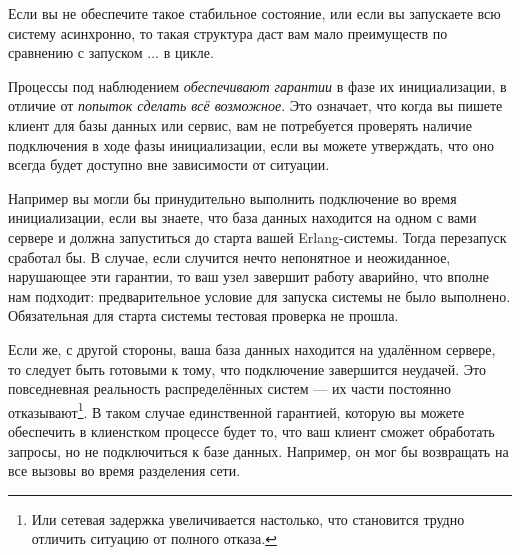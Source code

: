 Если вы не обеспечите такое стабильное состояние, или если вы запускаете всю систему асинхронно, то такая структура даст вам мало преимуществ по сравнению с запуском  ...  в цикле.

Процессы под наблюдением \emph{обеспечивают гарантии} в фазе их инициализации, в отличие от \emph{попыток сделать всё возможное}. Это означает, что когда вы пишете клиент для базы данных или сервис, вам не потребуется проверять наличие подключения в ходе фазы инициализации, если вы можете утверждать, что оно всегда будет доступно вне зависимости от ситуации.

Например вы могли бы принудительно выполнить подключение во время инициализации, если вы знаете, что база данных находится на одном с вами сервере и должна запуститься до старта вашей Erlang-системы. Тогда перезапуск сработал бы. В случае, если случится нечто непонятное и неожиданное, нарушающее эти гарантии, то ваш узел завершит работу аварийно, что вполне нам подходит: предварительное условие для запуска системы не было выполнено. Обязательная для старта системы тестовая проверка не прошла.

Если же, с другой стороны, ваша база данных находится на удалённом сервере, то следует быть готовыми к тому, что подключение завершится неудачей. Это повседневная реальность распределённых систем --- их части постоянно отказывают\footnote{Или сетевая задержка увеличивается настолько, что становится трудно отличить ситуацию от полного отказа.}. В таком случае единственной гарантией, которую вы можете обеспечить в клиенстком процессе будет то, что ваш клиент сможет обработать запросы, но не подключиться к базе данных. Например, он мог бы возвращать   на все вызовы во время разделения сети.

